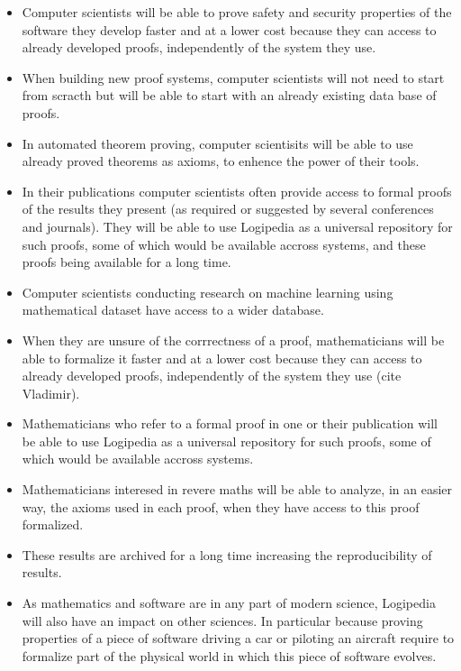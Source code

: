 \begin{itemize}

\item Computer scientists will be able to prove safety and security
  properties of the software they develop faster and at a lower cost
  because they can access to already developed proofs, independently
  of the system they use.

\item When building new proof systems, computer scientists will not
  need to start from scracth but will be able to start with an already
  existing data base of proofs.

\item In automated theorem proving, computer scientisits will be able
  to use already proved theorems as axioms, to enhence the power of
  their tools.

\item In their publications computer scientists often provide access
  to formal proofs of the results they present (as required or
  suggested by several conferences and journals). They will be able to
  use Logipedia as a universal repository for such proofs, some of
  which would be available accross systems, and these proofs being
  available for a long time.

\item Computer scientists conducting research on machine learning using
mathematical dataset have access to a wider database.

\item When they are unsure of the corrrectness of a proof, mathematicians
will be able to formalize it faster and at a lower cost because they
can access to already developed proofs, independently of the system
they use (cite Vladimir).

\item Mathematicians who refer to a formal proof in one or their publication
will be able to use Logipedia as a universal repository for such
proofs, some of which would be available accross systems.

\item Mathematicians interesed in revere maths will be able to analyze, in
an easier way, the axioms used in each proof, when they have access to
this proof formalized.

\item These results are archived for a long time increasing the
  reproducibility of results.

\item As mathematics and software are in any part of modern science,
  {\sc Logipedia} will also have an impact on other sciences. In
  particular because proving properties of a piece of software driving
  a car or piloting an aircraft require to formalize part of the
  physical world in which this piece of software evolves. 

\end{itemize}

